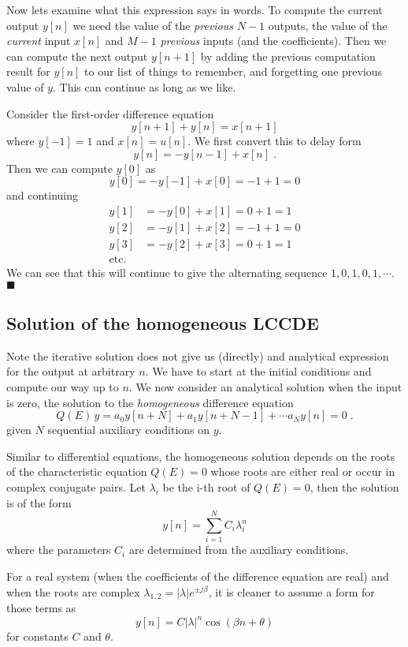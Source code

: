 Now lets examine what this expression says in words. To compute the current output $y[n]$ we need the value of the \emph{previous} $N-1$ outputs, the value of the \emph{current} input $x[n]$ and $M-1$ \emph{previous} inputs (and the coefficients). Then we can compute the next output $y[n+1]$ by adding the previous computation result for $y[n]$ to our list of things to remember, and forgetting one previous value of $y$. This can continue as long as we like.

\begin{example}
  Consider the first-order difference equation
  \[
  y[n+1] + y[n] = x[n+1]
  \]
  where $y[-1] = 1$ and $x[n] = u[n]$. We first convert this to delay form
  \[
  y[n] = -y[n-1] + x[n]\; .
  \]
  Then we can compute $y[0]$ as
  \[
  y[0] = -y[-1] + x[0] = -1 + 1 = 0
  \]
  and continuing
  \begin{align*}
  y[1] &= -y[0] + x[1] = 0 + 1 = 1\\
  y[2] &= -y[1] + x[2] = -1 + 1 = 0\\
  y[3] &= -y[2] + x[3] = 0 + 1 = 1\\
  \mbox{etc.}
  \end{align*}
  We can see that this will continue to give the alternating sequence $1,0,1,0,1,\cdots$.
$\blacksquare$
\end{example}

\subsection{Solution of the homogeneous LCCDE}

Note the iterative solution does not give us (directly) and analytical expression for the output at arbitrary $n$. We have to start at the initial conditions and compute our way up to $n$. We now consider an analytical solution when the input is zero, the solution to the \emph{homogeneous} difference equation
\[
Q(E)\, y = a_0y[n+N] + a_1y[n+N-1] + \cdots a_N y[n] = 0 \; .
\]
given $N$ sequential auxiliary conditions on $y$.

Similar to differential equations, the homogeneous solution depends on the roots of the characteristic equation $Q(E)=0$ whose roots are either real or occur in complex conjugate pairs. Let $\lambda_i$ be the i-th root of $Q(E) = 0$, then the solution is of the form
\[
y[n] = \sum\limits_{i=1}^N C_i \lambda_i^{n}
\]
where the parameters $C_i$ are determined from the auxiliary conditions.

For a real system (when the coefficients of the difference equation are real) and when the roots are complex $\lambda_{1,2} = |\lambda|e^{\pm j\beta}$, it is cleaner to assume a form for those terms as
\[
y[n] = C |\lambda|^n\cos(\beta n + \theta)
\]
for constants $C$ and $\theta$.


